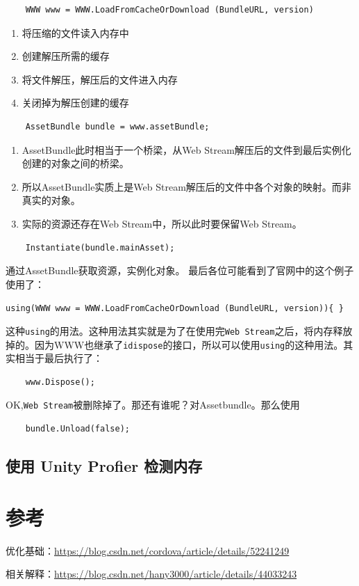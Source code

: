 \documentclass[UTF8,a4paper,12pt]{ctexart}
\begin{document}
  			\begin{lstlisting}
  	WWW www = WWW.LoadFromCacheOrDownload (BundleURL, version)			
  			\end{lstlisting}
  			\begin{enumerate}
  				\item 将压缩的文件读入内存中
  				\item 创建解压所需的缓存
  				\item 将文件解压，解压后的文件进入内存
  				\item 关闭掉为解压创建的缓存
  			\end{enumerate}
  			
  			\begin{lstlisting}
  	AssetBundle bundle = www.assetBundle;		
  			\end{lstlisting}
  			\begin{enumerate}
  				\item AssetBundle此时相当于一个桥梁，从Web Stream解压后的文件到最后实例化创建的对象之间的桥梁。
  				\item 所以AssetBundle实质上是Web Stream解压后的文件中各个对象的映射。而非真实的对象。
  				\item 实际的资源还存在Web Stream中，所以此时要保留Web Stream。
  			\end{enumerate}
  			\begin{lstlisting}
  	Instantiate(bundle.mainAsset);		
  			\end{lstlisting}
  			通过AssetBundle获取资源，实例化对象。
  			最后各位可能看到了官网中的这个例子使用了：
  			
  			\verb|using(WWW www = WWW.LoadFromCacheOrDownload (BundleURL, version)){ }|

  			这种\verb|using|的用法。这种用法其实就是为了在使用完\verb|Web Stream|之后，将内存释放掉的。因为WWW也继承了\verb|idispose|的接口，所以可以使用\verb|using|的这种用法。其实相当于最后执行了：
  			\begin{lstlisting}
  	www.Dispose();	
  			\end{lstlisting}
  			OK,\verb|Web Stream|被删除掉了。那还有谁呢？对Assetbundle。那么使用
  			\begin{lstlisting}
  	bundle.Unload(false);		
  			\end{lstlisting}
  			
  		\subsection{使用 Unity Profier 检测内存}
  
	\section{参考}
		优化基础：\url{https://blog.csdn.net/cordova/article/details/52241249}
		
		相关解释：\url{https://blog.csdn.net/hany3000/article/details/44033243}	    
\end{document}
